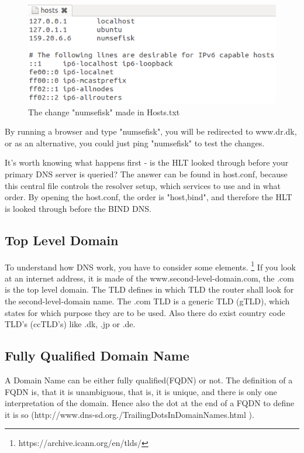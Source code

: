 \begin{figure}[ht!]
\centering
\includegraphics[width=150mm]{img/hostsText.png}
\caption{The change "numsefisk" made in Hosts.txt}
\label{hostsText}
\end{figure}

By running a browser and type "numsefisk", you will be redirected to www.dr.dk, or as an alternative, you could just ping "numsefisk" to test the changes.

It's worth knowing what happens first - is the HLT looked through before your primary DNS server is queried? 
The answer can be found in host.conf, because this central file controls the resolver setup, which services to use and in what order. By opening the host.conf, the order is "host,bind", and therefore the HLT is looked through before the BIND DNS.


\subsection{Top Level Domain}
To understand how DNS work, you have to consider some elements. \footnote{ https://archive.icann.org/en/tlds/ } If you look at an internet address, it is made of the www.second-level-domain.com, the .com is the top level domain. The TLD defines in which TLD the router shall look for the second-level-domain name.
The .com TLD is a generic TLD (gTLD), which states for which purpose they are to be used. Also there do exist country code TLD's (ccTLD's) like .dk, .jp or .de.

\subsection{Fully Qualified Domain Name}
A Domain Name can be either fully qualified(FQDN) or not. The definition of a FQDN is, that it is unambiguous, that is, it is unique, and there is only one interpretation of the domain. Hence also the dot at the end of a FQDN to define it is so (http://www.dns-sd.org./TrailingDotsInDomainNames.html ).

